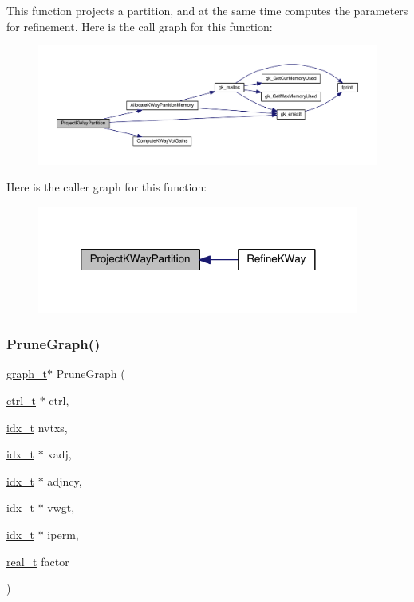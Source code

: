 This function projects a partition, and at the same time computes the parameters for refinement. Here is the call graph for this function\+:\nopagebreak
\begin{figure}[H]
\begin{center}
\leavevmode
\includegraphics[width=350pt]{a00945_a974cb62c010e195c90f8fb900359957c_cgraph}
\end{center}
\end{figure}
Here is the caller graph for this function\+:\nopagebreak
\begin{figure}[H]
\begin{center}
\leavevmode
\includegraphics[width=300pt]{a00945_a974cb62c010e195c90f8fb900359957c_icgraph}
\end{center}
\end{figure}
\mbox{\label{a00945_afc11099daf13e5e24f17076daf471765}} 
\subsubsection{\texorpdfstring{Prune\+Graph()}{PruneGraph()}}
{\footnotesize\ttfamily \hyperlink{a00734}{graph\+\_\+t}$\ast$ Prune\+Graph (\begin{DoxyParamCaption}\item[{\hyperlink{a00742}{ctrl\+\_\+t} $\ast$}]{ctrl,  }\item[{\hyperlink{a00876_aaa5262be3e700770163401acb0150f52}{idx\+\_\+t}}]{nvtxs,  }\item[{\hyperlink{a00876_aaa5262be3e700770163401acb0150f52}{idx\+\_\+t} $\ast$}]{xadj,  }\item[{\hyperlink{a00876_aaa5262be3e700770163401acb0150f52}{idx\+\_\+t} $\ast$}]{adjncy,  }\item[{\hyperlink{a00876_aaa5262be3e700770163401acb0150f52}{idx\+\_\+t} $\ast$}]{vwgt,  }\item[{\hyperlink{a00876_aaa5262be3e700770163401acb0150f52}{idx\+\_\+t} $\ast$}]{iperm,  }\item[{\hyperlink{a00876_a1924a4f6907cc3833213aba1f07fcbe9}{real\+\_\+t}}]{factor }\end{DoxyParamCaption})}

